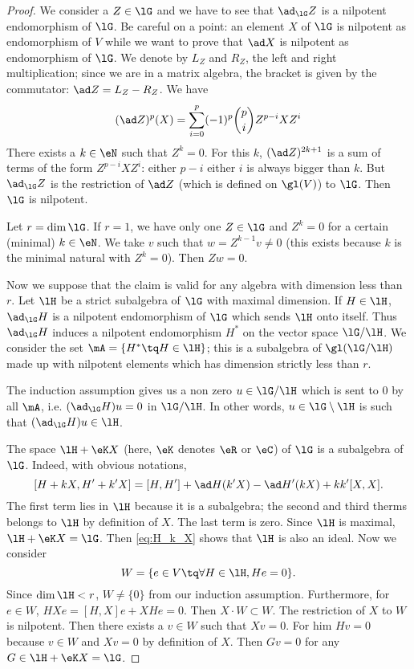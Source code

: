 \begin{proof}
 We consider a $Z\in\lG$ and we have to see that $\ad_{\lG}Z$ is a nilpotent endomorphism of $\lG$. Be careful on a point: an element $X$ of $\lG$ is nilpotent as endomorphism of $V$ while we want to prove that $\ad X$ is nilpotent as endomorphism of $\lG$. We denote by $L_Z$ and $R_Z$, the left and right multiplication; since we are in a matrix algebra, the bracket is given by the commutator: $\ad Z=L_Z-R_Z$. We have
\begin{equation}
(\ad Z)^p(X)=\sum_{i=0}^p(-1)^p \binom{p}{i}  Z^{p-i}XZ^i
\end{equation}
There exists a $k\in\eN$ such that $Z^k=0$. For this $k$, $(\ad Z)^{2k+1}$ is a sum of terms of the form $Z^{p-i}XZ^i$: either $p-i$ either $i$ is always bigger than $k$. But $\ad_{\lG}Z$ is the restriction of $\ad Z$ (which is defined on $\gl(V)$) to $\lG$. Then $\lG$ is nilpotent.

 Let $r=\dim\lG$. If $r=1$, we have only one $Z\in\lG$ and $Z^k=0$ for a certain (minimal) $k\in\eN$. We take $v$ such that $w=Z^{k-1}v\neq 0$ (this exists because $k$ is the minimal natural with $Z^k=0$). Then $Zw=0$.

Now we suppose that the claim is valid for any algebra with dimension less than $r$. Let $\lH$ be a strict subalgebra of $\lG$ with maximal dimension. If $H\in\lH$, $\ad_{\lG}H$ is a nilpotent endomorphism of $\lG$ which sends $\lH$ onto itself. Thus $\ad_{\lG}H$ induces a nilpotent endomorphism $H^*$ on the vector space $\lG/\lH$. We consider the set $\mA=\{H^*\tq H\in\lH\}$; this is a subalgebra of $\gl(\lG/\lH)$ made up with nilpotent elements which has dimension strictly less than $r$.

The induction assumption gives us a non zero $u\in \lG/\lH$ which is sent to $0$ by all $\mA$, i.e. $(\ad_{\lG}H)u=0$ in $\lG/\lH$. In other words, $u\in\lG\setminus\lH$ is such that $(\ad_{\lG}H)u\in\lH$.

The space $\lH+\eK X$ (here, $\eK$ denotes $\eR$ or $\eC$) of $\lG$ is a subalgebra of $\lG$. Indeed, with obvious notations,
\begin{equation}\label{eq:H_k_X}
[H+kX,H'+k'X]=[H,H']+\ad H(k'X)-\ad H'(kX)+kk'[X,X].
\end{equation}
The first term lies in $\lH$ because it is a subalgebra; the second and third therms belongs to $\lH$ by definition of $X$. The last term is zero. Since $\lH$ is maximal, $\lH+\eK X=\lG$. Then \eqref{eq:H_k_X} shows that $\lH$ is also an ideal. Now we consider
\[
  W=\{e\in V\tq\forall H\in\lH, He=0\}.
\]
Since $\dim\lH< r$, $W\neq\{0\}$ from our induction assumption. Furthermore, for $e\in W$, $HXe=[H,X]e+XHe=0$. Then $X\cdot W\subset W$. The restriction of $X$ to $W$ is nilpotent. Then there exists a $v\in W$ such that $Xv=0$. For him $Hv=0$ because $v\in W$ and $Xv=0$ by definition of $X$. Then $Gv=0$ for any $G\in\lH+\eK X=\lG$.


\end{proof}
